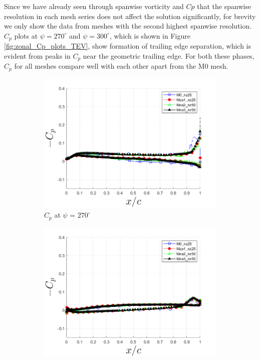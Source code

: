 Since we have already seen through spanwise vorticity and $Cp$ that the spanwise resolution in each mesh series does not affect the solution significantly, for brevity we only show the data from meshes with the second highest spanwise resolution. 
$C_p$ plots at $\psi=270^\circ$ and $\psi=300^\circ$, which is shown in Figure \ref{fig:zonal_Cp_plots_TEV}, show formation of trailing edge separation, which is evident from peaks in $C_p$ near the geometric trailing edge. 
For both these phases, $C_p$ for all meshes compare well with each other apart from the M0 mesh.


\begin{figure}[H]
\begin{subfigure}[b]{0.475\textwidth}
\centering
\includegraphics[width=1\textwidth]{figures/zonal_adapt_results/Cp/phase_270.png}
\caption{ $C_p$ at $\psi$ = $270^\circ$}
\label{fig:zonal_Cp_270}
\end{subfigure}
\begin{subfigure}[b]{0.475\textwidth}
\centering
\includegraphics[width=1\textwidth]{figures/zonal_adapt_results/Cp/phase_300.png}

\end{subfigure}
\end{figure}
